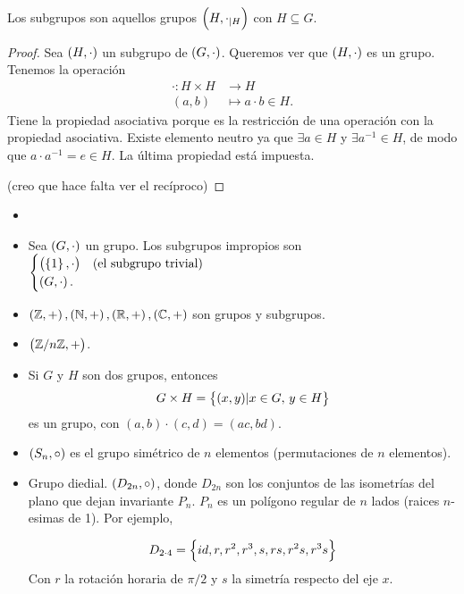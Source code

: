 \begin{obs}
    Los subgrupos son aquellos grupos $\left( H, \cdot_{\mid H} \right)$ con $H\subseteq G$.
\end{obs}
\begin{proof}
    Sea $\left( H, \cdot \right)$ un subgrupo de $\left( G, \cdot \right)$. Queremos ver que $\left( H, \cdot \right)$ es un grupo.
    Tenemos la operación
    \[
        \begin{aligned}
            \cdot \colon H \times H &\to H \\
            (a, b) &\mapsto a\cdot b \in H.
        \end{aligned}
    \]
    Tiene la propiedad asociativa porque es la restricción de una operación con la propiedad asociativa.
    Existe elemento neutro ya que $\exists a \in H$ y $\exists a^{-1} \in H$, de modo que $a\cdot a^{-1}=e \in H$.
    La última propiedad está impuesta.
    
    (creo que hace falta ver el recíproco)
\end{proof}

\begin{example}
    \begin{itemize}
        \item[]
        \item Sea $\left( G, \cdot \right)$ un grupo. Los subgrupos impropios son
                $\begin{cases}
                    \left( \left\{1\right\}, \cdot \right) &\text{(el subgrupo trivial)} \\
                    \left( G, \cdot \right). &
                \end{cases}$
        \item $\left( \mathbb{Z}, + \right), \left( \mathbb{N}, + \right), \left( \mathbb{R}, + \right), \left( \mathbb{C}, + \right)$ son grupos y subgrupos.
        \item $\left( \mathbb{Z}/n\mathbb{Z}, + \right)$.
        \item Si $G$ y $H$ son dos grupos, entonces
            \[
                 G \times H = \left\{(x,y) \vert x \in G, \, y \in H\right\}   
            \]
            es un grupo, con $(a, b) \cdot (c, d) = (ac, bd)$.
        \item $\left( S_n, \circ \right)$ es el grupo simétrico de $n$ elementos (permutaciones de $n$ elementos).
        \item Grupo diedial. $\left( D_{2n}, \circ \right)$, donde $D_{2n}$ son los conjuntos de las isometrías del plano que dejan invariante $P_n$.
            $P_n$ es un polígono regular de $n$ lados (raices $n$-esimas de 1). Por ejemplo,

            \[
                D_{2 \cdot 4} = \left\{id, r, r^2, r^3, s, rs, r^2s, r^3s\right\}
            \]
            Con $r$ la rotación horaria de $\pi / 2$ y $s$ la simetría respecto del eje $x$.
    \end{itemize}
\end{example}


